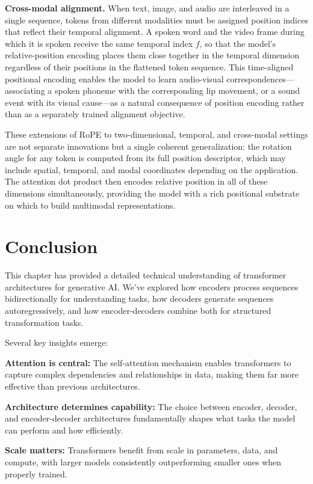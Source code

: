 \documentclass{book}
\begin{document}
\textbf{Cross-modal alignment.} When text, image, and audio are interleaved in
a single sequence, tokens from different modalities must be assigned position
indices that reflect their temporal alignment. A spoken word and the video
frame during which it is spoken receive the same temporal index $f$, so that
the model's relative-position encoding places them close together in the
temporal dimension regardless of their positions in the flattened token
sequence. This time-aligned positional encoding enables the model to learn
audio-visual correspondences---associating a spoken phoneme with the
corresponding lip movement, or a sound event with its visual cause---as a
natural consequence of position encoding rather than as a separately trained
alignment objective.

These extensions of RoPE to two-dimensional, temporal, and cross-modal
settings are not separate innovations but a single coherent generalization: the
rotation angle for any token is computed from its full position descriptor,
which may include spatial, temporal, and modal coordinates depending on the
application. The attention dot product then encodes relative position in all
of these dimensions simultaneously, providing the model with a rich positional
substrate on which to build multimodal representations.

\section{Conclusion}

This chapter has provided a detailed technical understanding of transformer architectures for generative AI. We've explored how encoders process sequences bidirectionally for understanding tasks, how decoders generate sequences autoregressively, and how encoder-decoders combine both for structured transformation tasks.

Several key insights emerge:

\textbf{Attention is central:} The self-attention mechanism enables transformers to capture complex dependencies and relationships in data, making them far more effective than previous architectures.

\textbf{Architecture determines capability:} The choice between encoder, decoder, and encoder-decoder architectures fundamentally shapes what tasks the model can perform and how efficiently.

\textbf{Scale matters:} Transformers benefit from scale in parameters, data, and compute, with larger models consistently outperforming smaller ones when properly trained.
\end{document}
